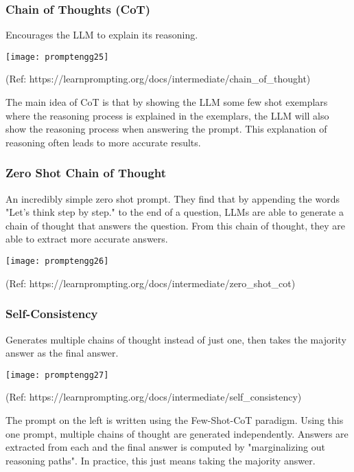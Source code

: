 \begin{frame}[fragile]\frametitle{Chain of Thoughts (CoT)}

Encourages the LLM to explain its reasoning. 

\begin{center}
\texttt{[image: promptengg25]}

{\tiny (Ref: https://learnprompting.org/docs/intermediate/chain\_of\_thought)}

\end{center}		

The main idea of CoT is that by showing the LLM some few shot exemplars where the reasoning process is explained in the exemplars, the LLM will also show the reasoning process when answering the prompt. This explanation of reasoning often leads to more accurate results.

\end{frame}

\begin{frame}[fragile]\frametitle{Zero Shot Chain of Thought}

An incredibly simple zero shot prompt. They find that by appending the words "Let's think step by step." to the end of a question, LLMs are able to generate a chain of thought that answers the question. From this chain of thought, they are able to extract more accurate answers.

\begin{center}
\texttt{[image: promptengg26]}

{\tiny (Ref: https://learnprompting.org/docs/intermediate/zero\_shot\_cot)}

\end{center}		

\end{frame}



\begin{frame}[fragile]\frametitle{Self-Consistency}

Generates multiple chains of thought instead of just one, then takes the majority answer as the final answer.

\begin{center}
\texttt{[image: promptengg27]}

{\tiny (Ref: https://learnprompting.org/docs/intermediate/self\_consistency)}

\end{center}		

The prompt on the left is written using the Few-Shot-CoT paradigm. Using this one prompt, multiple chains of thought are generated independently. Answers are extracted from each and the final answer is computed by "marginalizing out reasoning paths". In practice, this just means taking the majority answer.

\end{frame}


